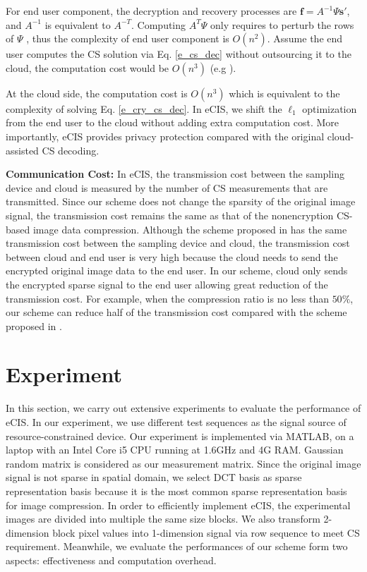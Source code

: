\documentclass[conference]{IEEEtran}
\begin{document}
For end user component, the decryption and recovery processes are $\mathbf{f}=A^{-1}\Psi \mathbf{s}'$, and $A^{-1}$ is equivalent to $A^{-T}$. Computing $A^T\Psi$ only requires to perturb the rows of $\Psi$ , thus the complexity of end user component is  $O(n^2)$. Assume  the end user computes  the CS solution via Eq. \ref{e_cs_dec} without outsourcing it to the cloud, the computation cost would be $O(n^3)$ (e.g \cite{OMP}).

At the cloud side, the computation  cost is $O(n^3)$ which is equivalent to the complexity of  solving  Eq. \ref{e_cry_cs_dec}. In  eCIS, we shift the $\ell_1$ optimization from the end user to the cloud without adding extra computation cost. More importantly, eCIS provides privacy protection  compared with the original cloud-assisted CS decoding.

\textbf{Communication Cost:} In eCIS, the transmission cost between the sampling device and cloud is measured by  the number of CS measurements that are transmitted. Since our scheme does not change the sparsity of the original image signal,  the transmission cost remains the same as that of the nonencryption CS-based image data compression. Although the scheme proposed in  \cite{wang2014privacy} has the same transmission cost between the sampling device and cloud, the transmission cost between cloud and end user is very high because the cloud needs to send the encrypted original image data to the end user. In our scheme, cloud only sends the encrypted sparse signal to the end user allowing great reduction of  the transmission cost. For example, when  the compression ratio is no less than  $50\%$, our scheme can reduce half of the transmission cost compared with the scheme proposed in \cite{wang2014privacy}.


\section{Experiment}
In this section, we carry out extensive experiments to evaluate the performance of eCIS. In our experiment, we use different test sequences as the signal source of resource-constrained device. Our experiment is implemented via MATLAB, on a laptop with an Intel Core i5 CPU running at 1.6GHz and 4G RAM. Gaussian random matrix  is considered as our measurement matrix. Since the original image signal is not sparse in spatial domain, we select DCT basis as sparse representation basis because it is the most common sparse representation basis for image compression. In order to efficiently implement eCIS, the experimental images are divided into multiple the same size blocks. We also transform 2-dimension block pixel values into 1-dimension signal via row sequence to meet CS requirement.
Meanwhile, we evaluate the performances of our scheme form two aspects: effectiveness and computation overhead.
\end{document}
